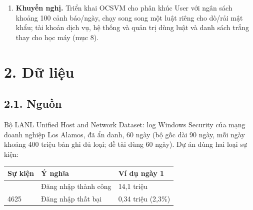 \documentclass[
  11pt,
]{article}
\providecommand{\tightlist}{%
  \setlength{\itemsep}{0pt}\setlength{\parskip}{0pt}}
\begin{document}
\begin{enumerate}
  \begin{itemize}
  \tightlist
  \item
    Phát hiện tốt brute-force, đổi loại logon, bùng nổ máy trạm mới; bắt
    kém ba loại: dời hoạt động sang ban đêm, rải mật khẩu (password
    spraying) và tài khoản ngủ đông thức dậy, do đặc trưng chỉ tính theo
    từng tài khoản trong từng ngày.
  \item
    Chọn scaler quyết định mô hình dựa trên khoảng cách: đổi
    RobustScaler sang StandardScaler nâng PR-AUC OCSVM từ 0,03 lên 0,24
    trên dev.
  \item
    Bớt đặc trưng làm mô hình tốt hơn: từ 41 xuống 22 đặc trưng, recall
    IF tăng 0,16 → 0,24 trên test.
  \item
    Cấu hình OCSVM tốt nhất trên dev (\texttt{g01}) kém ổn định trên
    test; cấu hình \texttt{nc1000} ổn định hơn và được khuyến nghị khi
    triển khai.
  \item
    LOF dùng chỉ mục láng giềng xấp xỉ đa luồng nên không tất định ở mức
    từng lần fit.
  \end{itemize}
\item
  \textbf{Khuyến nghị.} Triển khai OCSVM cho phân khúc User với ngân
  sách khoảng 100 cảnh báo/ngày, chạy song song một luật riêng cho
  dò/rải mật khẩu; tài khoản dịch vụ, hệ thống và quản trị dùng luật và
  danh sách trắng thay cho học máy (mục 8).
\end{enumerate}

\hypertarget{dux1eef-liux1ec7u}{%
\section{2. Dữ liệu}\label{dux1eef-liux1ec7u}}

\hypertarget{nguux1ed3n}{%
\subsection{2.1. Nguồn}\label{nguux1ed3n}}

Bộ LANL Unified Host and Network Dataset: log Windows Security của mạng
doanh nghiệp Los Alamos, đã ẩn danh, 60 ngày (bộ gốc dài 90 ngày, mỗi
ngày khoảng 400 triệu bản ghi đủ loại; đề tài dùng 60 ngày). Dự án dùng
hai loại sự kiện:

\begin{longtable}[]{@{}lll@{}}
\toprule\noalign{}
Sự kiện & Ý nghĩa & Ví dụ ngày 1 \\
\midrule\noalign{}
\endhead
\bottomrule\noalign{}
\endlastfoot
4624 & Đăng nhập thành công & 14,1 triệu \\
4625 & Đăng nhập thất bại & 0,34 triệu (2,3\%) \\
\end{longtable}
\end{document}

